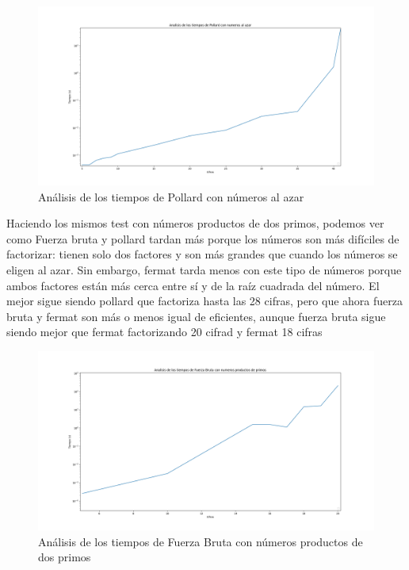 \documentclass{article}
\begin{document}
    \begin{figure}[ht!]
        \centering
        \includegraphics[scale=0.3]{Figure_5}
        \caption{Análisis de los tiempos de Pollard con números al azar}
        \label{fig:Figure_5}
    \end{figure}


    \newpage


    Haciendo los mismos test con números productos de dos primos, podemos ver como Fuerza  bruta y pollard tardan más porque los números son más difíciles de factorizar: tienen solo dos factores y son más grandes que cuando los números se eligen al azar. Sin embargo, fermat tarda menos con este tipo de números porque ambos factores están más cerca entre sí y de la raíz cuadrada del número. El mejor sigue siendo pollard que factoriza hasta las 28 cifras, pero que ahora fuerza bruta y fermat son más o menos igual de eficientes, aunque fuerza bruta sigue siendo mejor que fermat factorizando 20 cifrad y fermat 18 cifras

    \begin{figure}[ht!]
        \centering
        \includegraphics[scale=0.3]{Figure_2}
        \caption{Análisis de los tiempos de Fuerza Bruta con números productos de dos primos}
        \label{fig:Figure_2}
    \end{figure}
\end{document}
